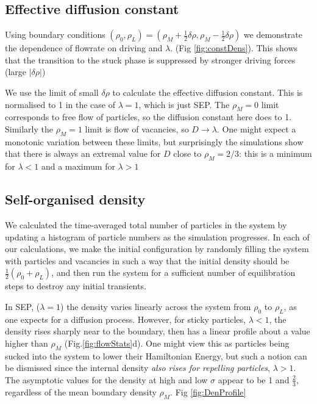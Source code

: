 \documentclass[
reprint, amsmath,amssymb,
]{revtex4-1}
\begin{document}
\subsection{Effective diffusion constant}


Using boundary conditions $(\rho_0, \rho_L) = (\rho_M + \frac{1}{2}
\delta\rho, \rho_M - \frac{1}{2} \delta\rho)$ we demonstrate the
dependence of flowrate on driving and $\lambda$.  (Fig \ref{fig:constDens}).  This
shows that the transition to the stuck phase is suppressed by stronger
driving forces (large $|\delta\rho|$)

We use the limit of small $\delta\rho$ to calculate the effective
diffusion constant.  This is normalised to 1 in the case of
$\lambda=1$, which is just SEP.  The $\rho_M=0$ limit corresponds to
free flow of particles, so the diffusion constant here does to
1. Similarly the $\rho_M=1$ limit is flow of vacancies, so
$D\rightarrow\lambda$.  One might expect a monotonic variation between
these limits, but surprisingly the simulations show that there is
always an extremal value for $D$ close to $\rho_M=2/3$: this is a
minimum for $\lambda<1$ and a maximum for $\lambda>1$


\subsection{Self-organised density}


We calculated the time-averaged total number of particles in
the system by updating a histogram of particle numbers
as the simulation progresses. In each of our calculations, we make the
initial configuration by randomly filling the system with particles
and vacancies in such a way that the initial density should be
$\frac{1}{2}(\rho_0 + \rho_L)$, and then run the system for a
sufficient number of equilibration steps to destroy any initial
transients.

In SEP, ($\lambda=1$) the density varies linearly across the system
from $\rho_0$ to $\rho_L$, as one expects for a diffusion process.
However, for sticky particles, $\lambda<1$, the density rises sharply
near to the boundary, then has a linear profile about a value higher
than $\rho_M$  (Fig.\ref{fig:flowStats}d). 
One might view this as particles being sucked into the
system to lower their Hamiltonian Energy, but such a notion can be
dismissed since the internal density {\it also rises for repelling
  particles}, $\lambda>1$.  The asymptotic values for the density at
high and low $\sigma$ appear to be 1 and $\frac{2}{3}$, regardless of the 
mean boundary density $\rho_M$.
Fig \ref{fig:DenProfile} 
\end{document}
